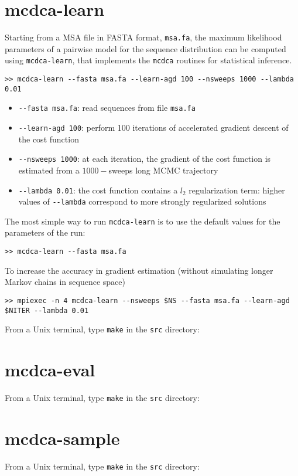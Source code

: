 \documentclass[a4paper,onecolumn]{article}
\begin{document}
\section{mcdca-learn}
\label{sec:mcdca-learn}
Starting from a MSA file in FASTA format, \verb|msa.fa|, the maximum likelihood parameters of a pairwise model for the sequence distribution
can be computed using \verb|mcdca-learn|, that implements the \verb|mcdca| routines for statistical inference.
\begin{verbatim}
>> mcdca-learn --fasta msa.fa --learn-agd 100 --nsweeps 1000 --lambda 0.01
\end{verbatim}
\begin{itemize}
\item \verb|--fasta msa.fa|: read sequences from file \verb|msa.fa|
\item \verb|--learn-agd 100|: perform 100 iterations of accelerated gradient descent of the cost function
\item \verb|--nsweeps 1000|: at each iteration, the gradient of the cost function is estimated from a $1000-$sweeps long MCMC trajectory
\item \verb|--lambda 0.01|: the cost function contains a $l_2$ regularization term: higher values of \verb|--lambda| correspond to more strongly regularized solutions
\end{itemize}


The most simple way to run \verb|mcdca-learn| is to use the default values for the parameters of the run:
\begin{verbatim}
>> mcdca-learn --fasta msa.fa
\end{verbatim}
To increase the accuracy in gradient estimation (without simulating longer Markov chains in sequence space)
\begin{verbatim}
>> mpiexec -n 4 mcdca-learn --nsweeps $NS --fasta msa.fa --learn-agd $NITER --lambda 0.01
\end{verbatim}
From a Unix terminal, type \verb|make| in the \verb|src| directory:

\section{mcdca-eval}
\label{sec:mcdca-eval}
From a Unix terminal, type \verb|make| in the \verb|src| directory:

\section{mcdca-sample}
\label{sec:mcdca-sample}
From a Unix terminal, type \verb|make| in the \verb|src| directory:
\end{document}
